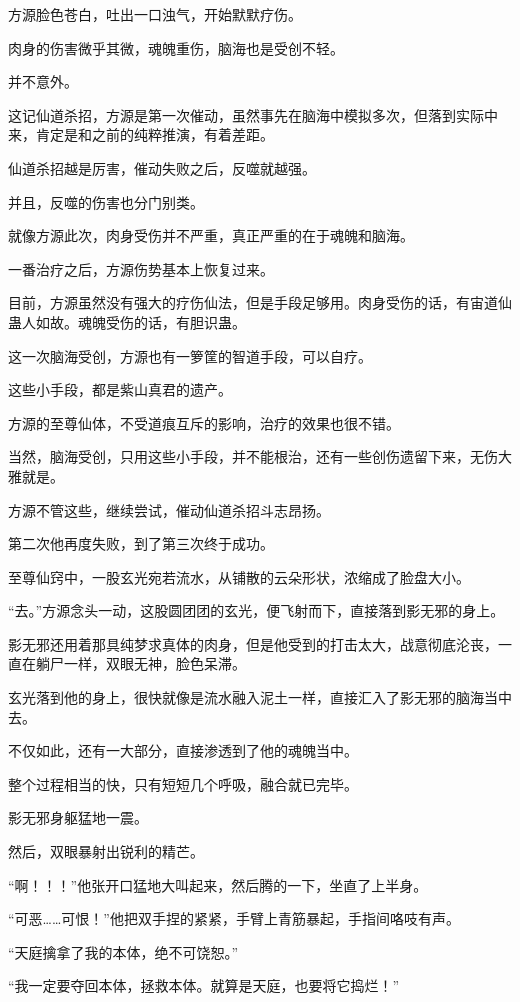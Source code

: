 \begin{this_body}
方源脸色苍白，吐出一口浊气，开始默默疗伤。

肉身的伤害微乎其微，魂魄重伤，脑海也是受创不轻。

并不意外。

这记仙道杀招，方源是第一次催动，虽然事先在脑海中模拟多次，但落到实际中来，肯定是和之前的纯粹推演，有着差距。

仙道杀招越是厉害，催动失败之后，反噬就越强。

并且，反噬的伤害也分门别类。

就像方源此次，肉身受伤并不严重，真正严重的在于魂魄和脑海。

一番治疗之后，方源伤势基本上恢复过来。

目前，方源虽然没有强大的疗伤仙法，但是手段足够用。肉身受伤的话，有宙道仙蛊人如故。魂魄受伤的话，有胆识蛊。

这一次脑海受创，方源也有一箩筐的智道手段，可以自疗。

这些小手段，都是紫山真君的遗产。

方源的至尊仙体，不受道痕互斥的影响，治疗的效果也很不错。

当然，脑海受创，只用这些小手段，并不能根治，还有一些创伤遗留下来，无伤大雅就是。

方源不管这些，继续尝试，催动仙道杀招斗志昂扬。

第二次他再度失败，到了第三次终于成功。

至尊仙窍中，一股玄光宛若流水，从铺散的云朵形状，浓缩成了脸盘大小。

“去。”方源念头一动，这股圆团团的玄光，便飞射而下，直接落到影无邪的身上。

影无邪还用着那具纯梦求真体的肉身，但是他受到的打击太大，战意彻底沦丧，一直在躺尸一样，双眼无神，脸色呆滞。

玄光落到他的身上，很快就像是流水融入泥土一样，直接汇入了影无邪的脑海当中去。

不仅如此，还有一大部分，直接渗透到了他的魂魄当中。

整个过程相当的快，只有短短几个呼吸，融合就已完毕。

影无邪身躯猛地一震。

然后，双眼暴射出锐利的精芒。

“啊！！！”他张开口猛地大叫起来，然后腾的一下，坐直了上半身。

“可恶……可恨！”他把双手捏的紧紧，手臂上青筋暴起，手指间咯吱有声。

“天庭擒拿了我的本体，绝不可饶恕。”

“我一定要夺回本体，拯救本体。就算是天庭，也要将它捣烂！”


\end{this_body}
